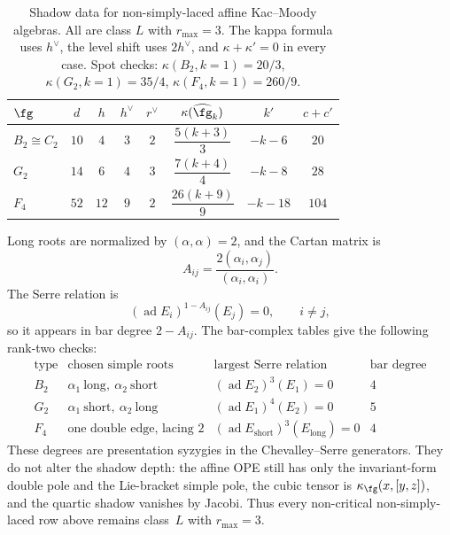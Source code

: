 \begin{table}[ht]
\centering
\renewcommand{\arraystretch}{1.3}
\begin{tabular}{lccccccc}
\toprule
$\fg$ & $d$ & $h$ & $h^\vee$ & $r^\vee$ &
$\kappa(\widehat{\fg}_k)$ & $k'$ & $c + c'$ \\
\midrule
$B_2 \cong C_2$ & $10$ & $4$ & $3$ & $2$ &
 $\dfrac{5(k+3)}{3}$ & $-k-6$ & $20$ \\[6pt]
$G_2$ & $14$ & $6$ & $4$ & $3$ &
 $\dfrac{7(k+4)}{4}$ & $-k-8$ & $28$ \\[6pt]
$F_4$ & $52$ & $12$ & $9$ & $2$ &
 $\dfrac{26(k+9)}{9}$ & $-k-18$ & $104$ \\
\bottomrule
\end{tabular}
\caption{Shadow data for non-simply-laced affine Kac--Moody
algebras. All are class $L$ with $r_{\max} = 3$. The
kappa formula uses $h^\vee$, the level shift uses $2h^\vee$, and
$\kappa + \kappa' = 0$ in every case. Spot checks:
$\kappa(B_2, k{=}1) = 20/3$,
$\kappa(G_2, k{=}1) = 35/4$,
$\kappa(F_4, k{=}1) = 260/9$.
}%
\label{tab:nsl-shadow-data}
\end{table}

\begin{remark}
\label{rem:nsl-root-serre-convention}
Long roots are normalized by $(\alpha,\alpha)=2$, and the Cartan
matrix is
\[
A_{ij}=\frac{2(\alpha_i,\alpha_j)}{(\alpha_i,\alpha_i)}.
\]
The Serre relation is
\[
(\operatorname{ad}E_i)^{1-A_{ij}}(E_j)=0,
\qquad i\neq j,
\]
so it appears in bar degree $2-A_{ij}$. The bar-complex tables give
the following rank-two checks:
\[
\begin{array}{c|c|c|c}
\text{type} & \text{chosen simple roots} & \text{largest Serre relation}
& \text{bar degree}\\
\hline
B_2 & \alpha_1\ \text{long},\ \alpha_2\ \text{short}
& (\operatorname{ad}E_2)^3(E_1)=0 & 4\\
G_2 & \alpha_1\ \text{short},\ \alpha_2\ \text{long}
& (\operatorname{ad}E_1)^4(E_2)=0 & 5\\
F_4 & \text{one double edge, lacing }2
& (\operatorname{ad}E_{\mathrm{short}})^3(E_{\mathrm{long}})=0 & 4
\end{array}
\]
These degrees are presentation syzygies in the Chevalley--Serre
generators. They do not alter the shadow depth: the affine OPE still
has only the invariant-form double pole and the Lie-bracket simple
pole, the cubic tensor is \(\kappa_{\fg}(x,[y,z])\), and the quartic
shadow vanishes by Jacobi. Thus every non-critical non-simply-laced
row above remains class~\(L\) with \(r_{\max}=3\).
\end{remark}

